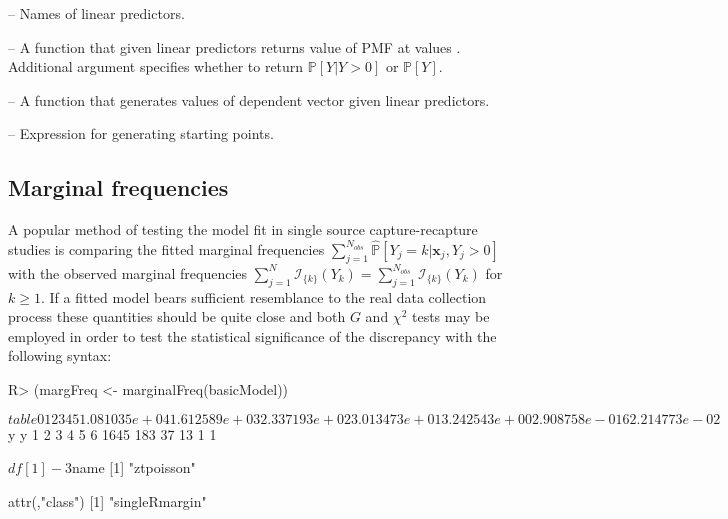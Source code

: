 \documentclass[
]{jss}
\newcommand{\1}{\mathcal{I}} \newcommand{\bx}{\boldsymbol{x}}
\begin{document}
{  \item {} -- Names of linear predictors.
  \item {} -- A function that given linear predictors returns value of PMF at values . Additional argument  specifies whether to return $\mathbb{P}[Y|Y>0]$ or $\mathbb{P}[Y]$.
  \item {} -- A function that generates values of dependent  vector given linear predictors.
  \item {} -- Expression for generating starting points.
}

\hypertarget{marginal-frequencies}{%
\subsection{Marginal frequencies}\label{marginal-frequencies}}

A popular method of testing the model fit in single source
capture-recapture studies is comparing the fitted marginal frequencies
\(\displaystyle\sum_{j=1}^{N_{obs}}\hat{\mathbb{P}}\left[Y_{j}=k|\boldsymbol{x}_{j}, Y_{j} > 0\right]\)
with the observed marginal frequencies
\(\displaystyle\sum_{j=1}^{N}\mathcal{I}_{\{k\}}(Y_{k})=\sum_{j=1}^{N_{obs}}\mathcal{I}_{\{k\}}(Y_{k})\)
for \(k\geq1\). If a fitted model bears sufficient resemblance to the
real data collection process these quantities should be quite close and
both \(G\) and \(\chi^{2}\) tests may be employed in order to test the
statistical significance of the discrepancy with the following
 syntax:

\begin{CodeChunk}
\begin{CodeInput}
R> (margFreq <- marginalFreq(basicModel))
\end{CodeInput}
\begin{CodeOutput}
$table
           0            1            2            3            4            5 
1.081035e+04 1.612589e+03 2.337193e+02 3.013473e+01 3.242543e+00 2.908758e-01 
           6 
2.214773e-02 

$y
y
   1    2    3    4    5    6 
1645  183   37   13    1    1 

$df
[1] -3

$name
[1] "ztpoisson"

attr(,"class")
[1] "singleRmargin"
\end{CodeOutput}
\end{CodeChunk}
\end{document}
